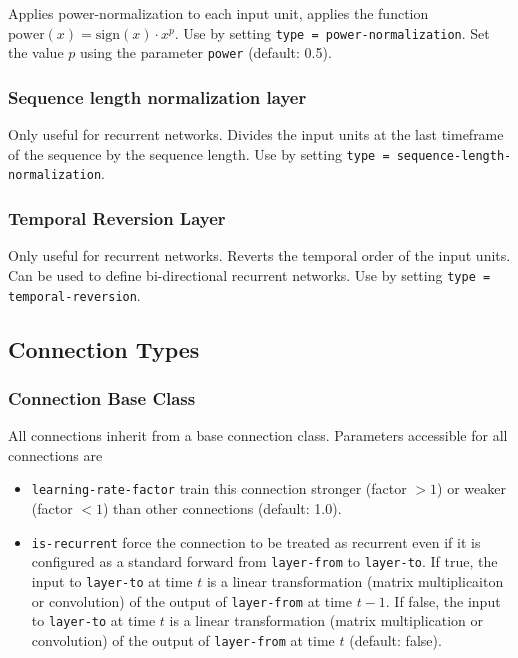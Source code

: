 Applies power-normalization to each input unit, \ie applies the function $ \mathrm{power}(x) = \mathrm{sign}(x) \cdot x^p $. Use by setting \texttt{type = power-normalization}.
Set the value $ p $ using the parameter \texttt{power} (default: 0.5).

\subsubsection*{Sequence length normalization layer}

Only useful for recurrent networks. Divides the input units at the last timeframe of the sequence by the sequence length. Use by setting \texttt{type = sequence-length-normalization}.

\subsubsection*{Temporal Reversion Layer}

Only useful for recurrent networks. Reverts the temporal order of the input units. Can be used to define bi-directional recurrent networks. Use by setting \texttt{type = temporal-reversion}.


\subsection{Connection Types}

\subsubsection*{Connection Base Class}

All connections inherit from a base connection class. Parameters accessible for all connections are
\begin{itemize}
    \item \texttt{learning-rate-factor} train this connection stronger (factor $ > 1 $) or weaker (factor $ < 1 $) than other connections (default: 1.0).
    \item \texttt{is-recurrent} force the connection to be treated as recurrent even if it is configured as a standard forward from \texttt{layer-from} to \texttt{layer-to}. If true, the input to \texttt{layer-to} at time $ t $ is a linear transformation (matrix multiplicaiton or convolution) of the output of \texttt{layer-from} at time $ t - 1 $. If false, the input to \texttt{layer-to} at time $ t $ is a linear transformation (matrix multiplication or convolution) of the output of \texttt{layer-from} at time $ t $ (default: false).
\end{itemize}

